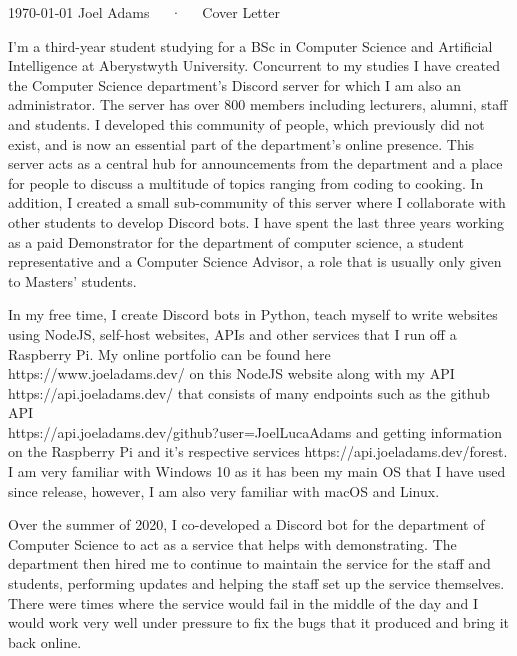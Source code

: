 \documentclass[11pt, a4paper]{awesome-cv}
\begin{document}
\makecvheader[R]

\makecvfooter
  {\today}
  {Joel Adams~~~·~~~Cover Letter}
  {}

\makelettertitle

\begin{cvletter}

I'm a third-year student studying for a BSc in Computer Science and Artificial Intelligence at Aberystwyth University. Concurrent to my studies I have created the Computer Science department's Discord server for which I am also an administrator. The server has over 800 members including lecturers, alumni, staff and students. I developed this community of people, which previously did not exist, and is now an essential part of the department's online presence. This server acts as a central hub for announcements from the department and a place for people to discuss a multitude of topics ranging from coding to cooking. In addition, I created a small sub-community of this server where I collaborate with other students to develop Discord bots. I have spent the last three years working as a paid Demonstrator for the department of computer science, a student representative and a Computer Science Advisor, a role that is usually only given to Masters’ students.

In my free time, I create Discord bots in Python, teach myself to write websites using NodeJS, self-host websites, APIs and other services that I run off a Raspberry Pi. My online portfolio can be found here https://www.joeladams.dev/ on this NodeJS website along with my API https://api.joeladams.dev/ that consists of many endpoints such as the github API \\https://api.joeladams.dev/github?user=JoelLucaAdams and getting information on the Raspberry Pi and it's respective services https://api.joeladams.dev/forest. I am very familiar with Windows 10 as it has been my main OS that I have used since release, however, I am also very familiar with macOS and Linux.
  
Over the summer of 2020, I co-developed a Discord bot for the department of Computer Science to act as a service that helps with demonstrating. The department then hired me to continue to maintain the service for the staff and students, performing updates and helping the staff set up the service themselves. There were times where the service would fail in the middle of the day and I would work very well under pressure to fix the bugs that it produced and bring it back online.
  

\end{cvletter}
\end{document}

